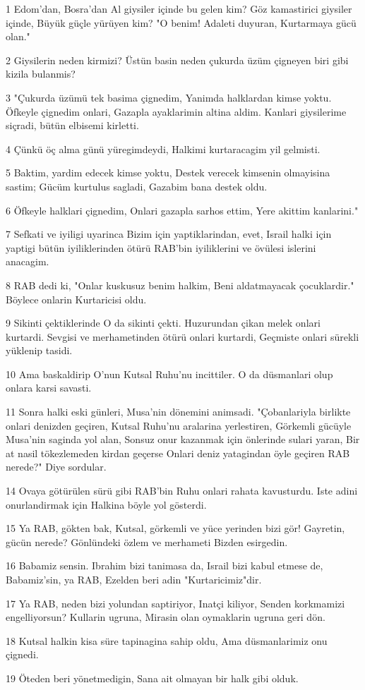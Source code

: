 \par 1 Edom'dan, Bosra'dan Al giysiler içinde bu gelen kim? Göz kamastirici giysiler içinde, Büyük güçle yürüyen kim? "O benim! Adaleti duyuran, Kurtarmaya gücü olan."
\par 2 Giysilerin neden kirmizi? Üstün basin neden çukurda üzüm çigneyen biri gibi kizila bulanmis?
\par 3 "Çukurda üzümü tek basima çignedim, Yanimda halklardan kimse yoktu. Öfkeyle çignedim onlari, Gazapla ayaklarimin altina aldim. Kanlari giysilerime siçradi, bütün elbisemi kirletti.
\par 4 Çünkü öç alma günü yüregimdeydi, Halkimi kurtaracagim yil gelmisti.
\par 5 Baktim, yardim edecek kimse yoktu, Destek verecek kimsenin olmayisina sastim; Gücüm kurtulus sagladi, Gazabim bana destek oldu.
\par 6 Öfkeyle halklari çignedim, Onlari gazapla sarhos ettim, Yere akittim kanlarini."
\par 7 Sefkati ve iyiligi uyarinca Bizim için yaptiklarindan, evet, Israil halki için yaptigi bütün iyiliklerinden ötürü RAB'bin iyiliklerini ve övülesi islerini anacagim.
\par 8 RAB dedi ki, "Onlar kuskusuz benim halkim, Beni aldatmayacak çocuklardir." Böylece onlarin Kurtaricisi oldu.
\par 9 Sikinti çektiklerinde O da sikinti çekti. Huzurundan çikan melek onlari kurtardi. Sevgisi ve merhametinden ötürü onlari kurtardi, Geçmiste onlari sürekli yüklenip tasidi.
\par 10 Ama baskaldirip O'nun Kutsal Ruhu'nu incittiler. O da düsmanlari olup onlara karsi savasti.
\par 11 Sonra halki eski günleri, Musa'nin dönemini animsadi. "Çobanlariyla birlikte onlari denizden geçiren, Kutsal Ruhu'nu aralarina yerlestiren, Görkemli gücüyle Musa'nin saginda yol alan, Sonsuz onur kazanmak için önlerinde sulari yaran, Bir at nasil tökezlemeden kirdan geçerse Onlari deniz yatagindan öyle geçiren RAB nerede?" Diye sordular.
\par 14 Ovaya götürülen sürü gibi RAB'bin Ruhu onlari rahata kavusturdu. Iste adini onurlandirmak için Halkina böyle yol gösterdi.
\par 15 Ya RAB, gökten bak, Kutsal, görkemli ve yüce yerinden bizi gör! Gayretin, gücün nerede? Gönlündeki özlem ve merhameti Bizden esirgedin.
\par 16 Babamiz sensin. Ibrahim bizi tanimasa da, Israil bizi kabul etmese de, Babamiz'sin, ya RAB, Ezelden beri adin "Kurtaricimiz"dir.
\par 17 Ya RAB, neden bizi yolundan saptiriyor, Inatçi kiliyor, Senden korkmamizi engelliyorsun? Kullarin ugruna, Mirasin olan oymaklarin ugruna geri dön.
\par 18 Kutsal halkin kisa süre tapinagina sahip oldu, Ama düsmanlarimiz onu çignedi.
\par 19 Öteden beri yönetmedigin, Sana ait olmayan bir halk gibi olduk.

